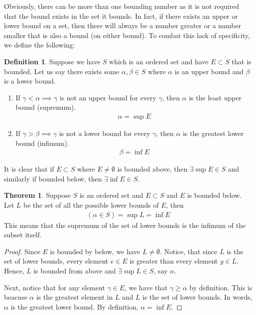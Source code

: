 \documentclass[14pt]{extarticle}
\theoremstyle{definition}
\newtheorem{definition}{Definition}[section]
\newtheorem{theorem}{Theorem}[section]
\begin{document}
Obviously, there can be more than one bounding number as it is not required that the bound exists in the set it bounds. In fact, if
there exists an upper or lower bound on a set, then there will always be a number greater or a number smaller that is also a bound (on 
either bound). To combat this lack of specificity, we define the following:

\begin{definition}
    Suppose we have $S$ which is an ordered set and have $E\subset S$ that is bounded. Let us say there exists some $\alpha, \beta \in S$
    where $\alpha$ is an upper bound and $\beta$ is a lower bound.
    \begin{enumerate}[label=(\arabic*)]
        \item If $\gamma < \alpha \implies \gamma$ is not an upper bound for every $\gamma$, then $\alpha$ is the least upper bound 
            (supremum).
            \begin{align*}
                \alpha = \sup E
            \end{align*}
        \item If $\gamma > \beta \implies \gamma$ is not a lower bound for every $\gamma$, then $\alpha$ is the greatest lower bound 
            (infimum).
            \begin{align*}
                \beta = \inf E
            \end{align*}
    \end{enumerate}
\end{definition}

It is clear that if $E\subset S$ where $E \neq \emptyset$ is bounded above, then $\exists\sup E \in S$ and similarly if bounded below,
then $\exists\inf E\in S$.

\pagebreak
\begin{theorem}
    Suppose $S$ is an ordered set and $E\subset S$ and $E$ is bounded below. Let $L$ be the set of all the possible lower bounds of $E$,
    then
    \begin{align*}
        \left(\alpha \in S\right) = \sup L = \inf E
    \end{align*}
    This means that the supremum of the set of lower bounds is the infimum of the subset itself.
\end{theorem}

\begin{proof}
    Since $E$ is bounded by below, we have $L\neq \emptyset$. Notice, that since $L$ is the set of lower bounds, every element $e\in E$
    is greater than every element $y\in L$. Hence, $L$ is bounded from above and $\exists\sup L\in S$, say $\alpha$.
    
    Next, notice that for any element $\gamma \in E$, we have that $\gamma \geq \alpha$ by definition. This is beacuse $\alpha$ is the
    greatest element in $L$ and $L$ is the set of lower bounds. In words, $\alpha$ is the greatest lower bound. By definition,
    $\alpha = \inf E$. 
\end{proof}
\end{document}
